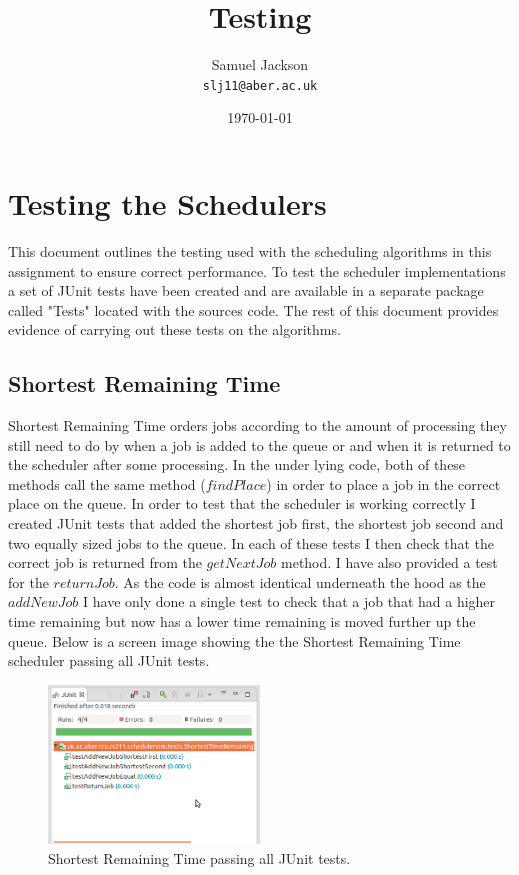 \documentclass{article}
\begin{document}
\title{Testing}
\author{Samuel Jackson \\ \texttt{slj11@aber.ac.uk}}
\date{\today}
\maketitle

\newpage
\section{Testing the Schedulers}
This document outlines the testing used with the scheduling algorithms in this assignment to ensure correct performance. To test the scheduler implementations a set of JUnit tests have been created and are available in a separate package called "Tests" located with the sources code. The rest of this document provides evidence of carrying out these tests on the algorithms.

\subsection{Shortest Remaining Time}
Shortest Remaining Time orders jobs according to the amount of processing they still need to do by when a job is added to the queue or and when it is returned to the scheduler after some processing. In the under lying code, both of these methods call the same method ($findPlace$) in order to place a job in the correct place on the queue. In order to test that the scheduler is working correctly I created JUnit tests that added the shortest job first, the shortest job second and two equally sized jobs to the queue. In each of these tests I then check that the correct job is returned from the $getNextJob$ method. I have also provided a test for the $returnJob$. As the code is almost identical underneath the hood as the $addNewJob$ I have only done a single test to check that a job that had a higher time remaining but now has a lower time remaining is moved further up the queue. Below is a screen image showing the the Shortest Remaining Time scheduler passing all JUnit tests.

\begin{figure}[H]
\centering
\includegraphics[width=0.5\textwidth]{img/str_test.png}
\caption{Shortest Remaining Time passing all JUnit tests.}
\label{fig:str-test}
\end{figure}
\end{document}
